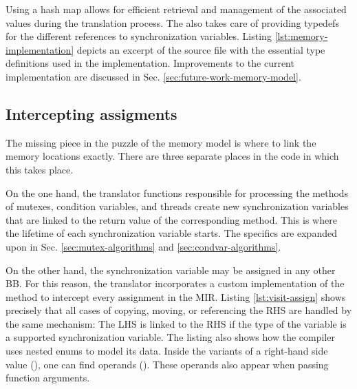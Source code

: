 Using a hash map allows for efficient retrieval
and management of the associated values during the translation process.
The  also takes care of providing typedefs for the different
references to synchronization variables.
Listing \ref{lst:memory-implementation} depicts an excerpt of the source file
with the essential type definitions used in the implementation.
Improvements to the current implementation are discussed in Sec. \ref{sec:future-work-memory-model}.

\subsection{Intercepting assigments}
\label{sec:intercepting-assignments}

The missing piece in the puzzle of the memory model is
where to link the memory locations exactly.
There are three separate places in the code in which this takes place.

On the one hand, the translator functions responsible for processing the methods
of mutexes, condition variables, and threads create new synchronization variables
that are linked to the return value of the corresponding method.
This is where the lifetime of each synchronization variable starts.
The specifics are expanded upon
in Sec. \ref{sec:mutex-algorithms} and \ref{sec:condvar-algorithms}.

On the other hand, the synchronization variable may be assigned in any other \acrshort{BB}.
For this reason, the translator incorporates a custom implementation of the method
 to intercept every assignment in the \acrshort{MIR}.
Listing \ref{lst:visit-assign} shows precisely
that all cases of copying, moving, or referencing the \acrfull{RHS}
are handled by the same mechanism:
The \acrfull{LHS} is linked to the \acrfull{RHS}
if the type of the variable is a supported synchronization variable.
The listing also shows how the compiler uses nested enums to model its data.
Inside the variants of a right-hand side value (),
one can find operands ().
These operands also appear when passing function arguments.


